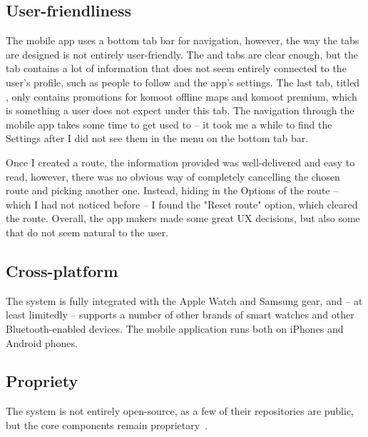 \subsection*{User-friendliness}
The mobile app uses a bottom tab bar for navigation, however, the way the tabs are designed is not entirely user-friendly.
The  and  tabs are clear enough, but the  tab contains a lot of information that does not seem entirely connected to the user's profile, such as people to follow and the app's settings.
The last tab, titled , only contains promotions for komoot offline maps and komoot premium, which is something a user does not expect under this tab.
The navigation through the mobile app takes some time to get used to -- it took me a while to find the Settings after I did not see them in the menu on the bottom tab bar.

Once I created a route, the information provided was well-delivered and easy to read, however, there was no obvious way of completely cancelling the chosen route and picking another one.
Instead, hiding in the Options of the route -- which I had not noticed before -- I found the "Reset route" option, which cleared the route.
Overall, the app makers made some great UX decisions, but also some that do not seem natural to the user.
\subsection*{Cross-platform}
The system is fully integrated with the Apple Watch and Samsung gear, and -- at least limitedly -- supports a number of other brands of smart watches and other Bluetooth-enabled devices.
The mobile application runs both on iPhones and Android phones.
\subsection*{Propriety}
The system is not entirely open-source, as a few of their repositories are public, but the core components remain proprietary~\cite{komoot-github}.

